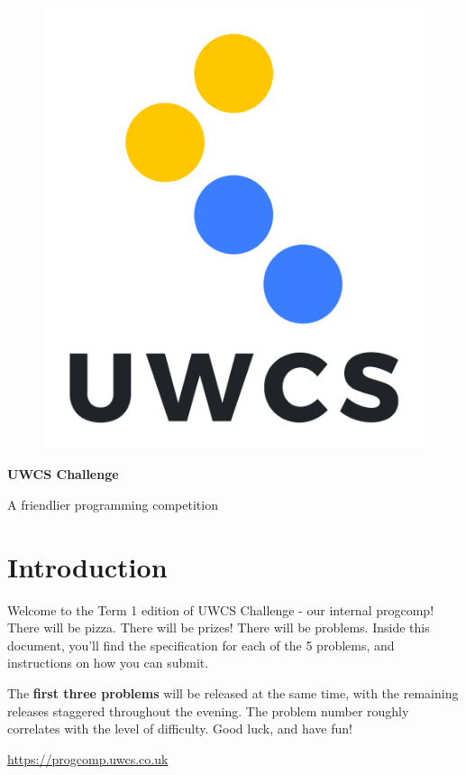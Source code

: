 \documentclass[a4paper,11pt,parskip=half-]{scrartcl}
\begin{document}
\begin{figure}
    \vspace{-10pt} %
    \includegraphics[width=0.9\linewidth]{shield.png}
    \vspace{-100pt} %
\end{figure}

\normalfont \Huge \bfseries UWCS Challenge

\normalfont\Large A friendlier programming competition
\normalsize

\section*{Introduction}

Welcome to the Term 1 edition of UWCS Challenge - our internal progcomp! 
There will be pizza. 
There will be prizes! 
There will be problems.
Inside this document, you'll find the specification for each of the 5 problems, and instructions on how you can submit.

The \textbf{first three problems} will be released at the same time, with the remaining releases staggered throughout the evening.
The problem number roughly correlates with the level of difficulty.
Good luck, and have fun!

\begin{center}
    \huge \url{https://progcomp.uwcs.co.uk} \normalsize
\end{center}


\tableofcontents



\newpage




\newpage

\newpage

\newpage

\newpage

\end{document}
